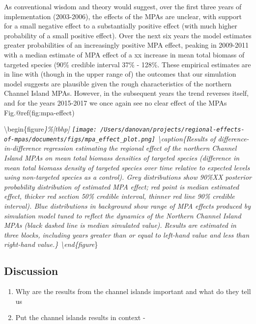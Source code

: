 \documentclass[9pt,twocolumn,twoside,lineno]{pnas-new}
\begin{document}
As conventional wisdom and theory would suggest, over the first three
years of implementation (2003-2006), the effects of the MPAs are
unclear, with support for a small negative effect to a substantially
positive effect (with much higher probability of a small positive
effect). Over the next six years the model estimates greater
probabilities of an increasingly positive MPA effect, peaking in
2009-2011 with a median estimate of MPA effect of a xx increase in mean
total biomass of targeted species (90\% credible interval 37\% - 128\%.
These empirical estimates are in line with (though in the upper range
of) the outcomes that our simulation model suggests are plausible given
the rough characteristics of the northern Channel Island MPAs. However,
in the subsequent years the trend reverses itself, and for the years
2015-2017 we once again see no clear effect of the MPAs
Fig.@ref(fig:mpa-effect)

\textbackslash begin\{figure\emph{\}\%{[}tbhp{]} \centering
\texttt{[image: /Users/danovan/projects/regional-effects-of-mpas/documents/figs/mpa\_effect\_plot.png]}
\textbackslash caption\{Results of difference-in-difference regression
estimating the regional effect of the northern Channel Island MPAs on
mean total biomass densities of targeted species (difference in mean
total biomass density of targeted species over time relative to expected
levels using non-targeted species as a control). Grey distributions show
90\%XX posterior probability distribution of estimated MPA effect; red
point is median estimated effect, thicker red section 50\% credible
interval, thinner red line 90\% credible interval). Blue distributions
in background show range of MPA effects produced by simulation model
tuned to reflect the dynamics of the Northern Channel Island MPAs (black
dashed line is median simulated value). Results are estimated in three
blocks, including years greater than or equal to left-hand value and
less than right-hand value.\} \label{mpa-effect}
\textbackslash end\{figure}\}

\hypertarget{discussion}{%
\subsection*{Discussion}\label{discussion}}

\begin{enumerate}
\def\labelenumi{\arabic{enumi}.}
\item
  Why are the results from the channel islands important and what do
  they tell us
\item
  Put the channel islands results in context -
\end{enumerate}
\end{document}
